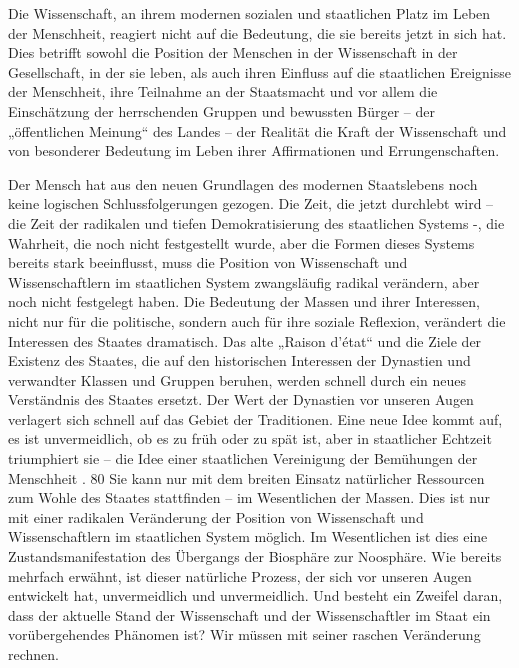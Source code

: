 \documentclass[11pt,a4paper]{book}
\begin{document}
Die Wissenschaft, an ihrem modernen sozialen und staatlichen Platz im Leben der Menschheit, reagiert nicht auf die Bedeutung, die sie bereits jetzt in sich hat. Dies betrifft sowohl die Position der Menschen in der Wissenschaft in der Gesellschaft, in der sie leben, als auch ihren Einfluss auf die staatlichen Ereignisse der Menschheit, ihre Teilnahme an der Staatsmacht und vor allem die Einschätzung der herrschenden Gruppen und bewussten Bürger -- der „öffentlichen Meinung“ des Landes -- der Realität die Kraft der Wissenschaft und von besonderer Bedeutung im Leben ihrer Affirmationen und Errungenschaften.



Der Mensch hat aus den neuen Grundlagen des modernen Staatslebens noch keine logischen Schlussfolgerungen gezogen. Die Zeit, die jetzt durchlebt wird -- die Zeit der radikalen und tiefen Demokratisierung des staatlichen Systems -, die Wahrheit, die noch nicht festgestellt wurde, aber die Formen dieses Systems bereits stark beeinflusst, muss die Position von Wissenschaft und Wissenschaftlern im staatlichen System zwangsläufig radikal verändern, aber noch nicht festgelegt haben. Die Bedeutung der Massen und ihrer Interessen, nicht nur für die politische, sondern auch für ihre soziale Reflexion, verändert die Interessen des Staates dramatisch. Das alte „Raison d'état“ und die Ziele der Existenz des Staates, die auf den historischen Interessen der Dynastien und verwandter Klassen und Gruppen beruhen, werden schnell durch ein neues Verständnis des Staates ersetzt. Der Wert der Dynastien vor unseren Augen verlagert sich schnell auf das Gebiet der Traditionen. Eine neue Idee kommt auf, es ist unvermeidlich, ob es zu früh oder zu spät ist, aber in staatlicher Echtzeit triumphiert sie -- die Idee einer staatlichen Vereinigung der Bemühungen der Menschheit . 80 Sie kann nur mit dem breiten Einsatz natürlicher Ressourcen zum Wohle des Staates stattfinden -- im Wesentlichen der Massen. Dies ist nur mit einer radikalen Veränderung der Position von Wissenschaft und Wissenschaftlern im staatlichen System möglich. Im Wesentlichen ist dies eine Zustandsmanifestation des Übergangs der Biosphäre zur Noosphäre. Wie bereits mehrfach erwähnt, ist dieser natürliche Prozess, der sich vor unseren Augen entwickelt hat, unvermeidlich und unvermeidlich. Und besteht ein Zweifel daran, dass der aktuelle Stand der Wissenschaft und der Wissenschaftler im Staat ein vorübergehendes Phänomen ist? Wir müssen mit seiner raschen Veränderung rechnen.
\end{document}
